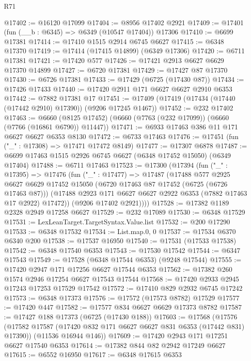 \begin{lexlean}{R71}
\begin{coremodule}
@17402 := @16120 @17099
@17404 := @8956 @17402 @2921
@17409 := @17401 (fun (__b : @6345) => @6349 (@10547 @17404)) @17306
@17410 := @6699 @17381
@17414 := @17410 @1515 @2914 @6745 @6627
@17415 := @6348 @17370
@17419 := @17414 (@17415 @14899) (@6349 @17306)
@17420 := @6711 @17381
@17421 := @17420 @577
@17426 := @17421 @2913 @6627 @6629 @17370 @14899
@17427 := @6720 @17381
@17429 := @17427 @87 @17370
@17430 := @6726 @17381
@17433 := @17429 (@6725 (@17430 @87))
@17434 := @17426 @17433
@17440 := @17420 @2911 @171 @6627 @6627 @2910 @6353
@17442 := @7882 @17381 @17
@17451 := @17409 (@17419 (@17434 (@17440 (@17442 @2910) @17390)) (@9206 @17245 @1467))
@17452 := @232 @17402
@17463 := @6660 (@8125 @17452) (@6660 (@7763 (@232 @17099)) (@6660 (@7766 (@16861 @6790)) @11447))
@17471 := @6933 @17463 @386 @11 @171 @6627 @6627 @6353 @8130
@17472 := @6733 @17463
@17476 := @17451 (fun ("_" : @17308) => @17471 @17472 @8149)
@17477 := @17307 @6878
@17487 := @6699 @17463 @1515 @2926 @6745 @6627 (@6348 @17452 @15050) (@6349 @17404)
@17488 := @6711 @17463
@17523 := @17300
    (@17394
      (fun ("_" : @17395) =>
      @17476
        (fun ("_" : @17477) =>
        @17487
          (@17488
            @577
            @2925
            @6627
            @6629
            @17452
            @15050
            (@6720 @17463 @87 @17452 (@6725 (@6726 @17463 @87)))
            (@17488 @2923 @171 @6627 @6627 @2922 @6353 (@7882 @17463 @17 @2922) @17472))
          (@9206 @17402 @2921))))
@17528 := @17382 @1189 @2328 @2949 @17258 @6627
@17529 := @232 @17089
@17530 := @6348 @17529
@17531 := LexLeanTarget.TargetSyntax.Value.list
@17532 := @200 @17290
@17533 := @6348 @17532
@17534 := List.map.{0, 0}
@17537 := @17534 @6370 @6340 @200
@17538 := @17537 @16950
@17540 := @17531 (@17533 @17538)
@17542 := @6348 @17540 @6353
@17543 := @17530 @17542
@17544 := @6347 @17543
@17549 := @17528 (@6348 @17544 @6353) (@9248 @17544)
@17555 := @17420 @2947 @171 @17256 @6627 @17544 @6353
@17562 := @17382 @260 @1574 @2946 @17254 @6627 @17543 @17544
@17568 := @17420 @2933 @2945 @17243 @17253 @17529 @17542
@17572 := @17410 @829 @2932 @6745 @17242
@17573 := @6348 @17373
@17576 := @17572 (@17573 @8782) @17529
@17577 := @17420 @447
@17582 := @17577 @834 @6627 @6629 @17373 @8782
@17587 := @17427 @188 @17373 (@6725 (@17430 @188))
@17603 := @17568
    (@17576
      (@17582 @17587 (@17420 @832 @171 @6627 @6627 @831 @6353 (@17442 @831) @17390))
      (@11536 @16944 @146))
@17609 := @17420 @2943 @171 @17251 @6627 @17540 @6353
@17614 := @17382 @844 @82 @2942 @17249 @6627
@17615 := @6552 @16950
@17617 := @6348 @17615 @6353

\end{coremodule}
\end{lexlean}
